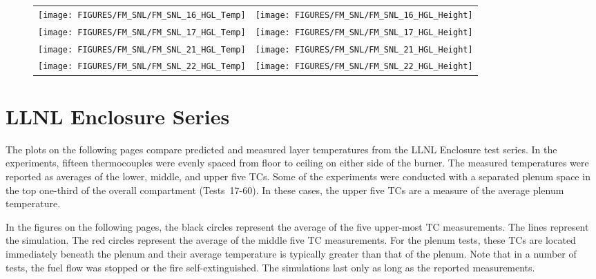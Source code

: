 \begin{figure}[p]
\begin{tabular*}{\textwidth}{l@{\extracolsep{\fill}}r}
\texttt{[image: FIGURES/FM\_SNL/FM\_SNL\_16\_HGL\_Temp]} &
\texttt{[image: FIGURES/FM\_SNL/FM\_SNL\_16\_HGL\_Height]} \\
\texttt{[image: FIGURES/FM\_SNL/FM\_SNL\_17\_HGL\_Temp]} &
\texttt{[image: FIGURES/FM\_SNL/FM\_SNL\_17\_HGL\_Height]} \\
\texttt{[image: FIGURES/FM\_SNL/FM\_SNL\_21\_HGL\_Temp]} &
\texttt{[image: FIGURES/FM\_SNL/FM\_SNL\_21\_HGL\_Height]} \\
\texttt{[image: FIGURES/FM\_SNL/FM\_SNL\_22\_HGL\_Temp]} &
\texttt{[image: FIGURES/FM\_SNL/FM\_SNL\_22\_HGL\_Height]}
\end{tabular*}
\end{figure}

\clearpage


\section{LLNL Enclosure Series}

The plots on the following pages compare predicted and measured layer temperatures from the LLNL Enclosure test series. In the experiments, fifteen thermocouples were evenly spaced from floor to ceiling on either side of the burner. The measured temperatures were reported as averages of the lower, middle, and upper five TCs. Some of the experiments were conducted with a separated plenum space in the top one-third of the overall compartment (Tests~17-60). In these cases, the upper five TCs are a measure of the average plenum temperature.

In the figures on the following pages, the black circles represent the average of the five upper-most TC measurements. The lines represent the simulation. The red circles represent the average of the middle five TC measurements. For the plenum tests, these TCs are located immediately beneath the plenum and their average temperature is typically greater than that of the plenum. Note that in a number of tests, the fuel flow was stopped or the fire self-extinguished. The simulations last only as long as the reported measurements.

\newpage

